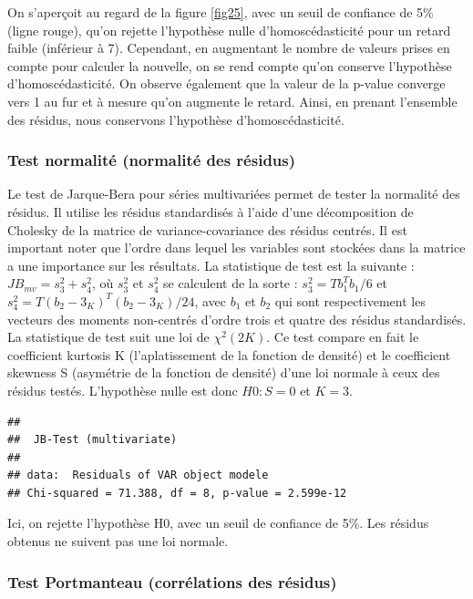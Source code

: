 \documentclass[11pt,]{article}
\begin{document}
On s'aperçoit au regard de la figure \ref{fig25}, avec un seuil de
confiance de 5\% (ligne rouge), qu'on rejette l'hypothèse nulle
d'homoscédasticité pour un retard faible (inférieur à 7). Cependant, en
augmentant le nombre de valeurs prises en compte pour calculer la
nouvelle, on se rend compte qu'on conserve l'hypothèse
d'homoscédasticité. On observe également que la valeur de la p-value
converge vers 1 au fur et à mesure qu'on augmente le retard. Ainsi, en
prenant l'ensemble des résidus, nous conservons l'hypothèse
d'homoscédasticité.

\subsubsection{Test normalité (normalité des
résidus)}\label{test-normalite-normalite-des-residus}

Le test de Jarque-Bera pour séries multivariées permet de tester la
normalité des résidus. Il utilise les résidus standardisés à l'aide
d'une décomposition de Cholesky de la matrice de variance-covariance des
résidus centrés. Il est important noter que l'ordre dans lequel les
variables sont stockées dans la matrice a une importance sur les
résultats. La statistique de test est la suivante :
\(JB_{mv} = s_3^2 + s_4^2\), où \(s_3^2\) et \(s_4^2\) se calculent de
la sorte : \(s_3^2 = Tb_1^Tb_1/6\) et
\(s_4^2 = T(b_2 - 3_K)^T(b_2-3_K)/24\), avec \(b_1\) et \(b_2\) qui sont
respectivement les vecteurs des moments non-centrés d'ordre trois et
quatre des résidus standardisés. La statistique de test suit une loi de
\(\chi^2(2K)\). Ce test compare en fait le coefficient kurtosis K
(l'aplatissement de la fonction de densité) et le coefficient skewness S
(asymétrie de la fonction de densité) d'une loi normale à ceux des
résidus testés. L'hypothèse nulle est donc \(H0 : S = 0\) et \(K = 3\).

\begin{verbatim}
## 
##  JB-Test (multivariate)
## 
## data:  Residuals of VAR object modele
## Chi-squared = 71.388, df = 8, p-value = 2.599e-12
\end{verbatim}

Ici, on rejette l'hypothèse H0, avec un seuil de confiance de 5\%. Les
résidus obtenus ne suivent pas une loi normale.

\subsubsection{Test Portmanteau (corrélations des
résidus)}\label{test-portmanteau-correlations-des-residus}
\end{document}
